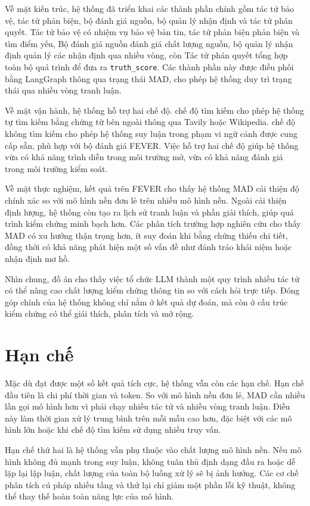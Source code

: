 ﻿\documentclass[oneside,a4paper,12pt]{extreport}
\begin{document}
Về mặt kiến trúc, hệ thống đã triển khai các thành phần chính gồm tác tử bảo vệ, tác tử phản biện, bộ đánh giá nguồn, bộ quản lý nhận định và tác tử phán quyết. Tác tử bảo vệ có nhiệm vụ bảo vệ bản tin, tác tử phản biện phản biện và tìm điểm yếu, Bộ đánh giá nguồn đánh giá chất lượng nguồn, bộ quản lý nhận định quản lý các nhận định qua nhiều vòng, còn Tác tử phán quyết tổng hợp toàn bộ quá trình để đưa ra \texttt{truth\_score}. Các thành phần này được điều phối bằng LangGraph thông qua trạng thái MAD, cho phép hệ thống duy trì trạng thái qua nhiều vòng tranh luận.

Về mặt vận hành, hệ thống hỗ trợ hai chế độ. chế độ tìm kiếm cho phép hệ thống tự tìm kiếm bằng chứng từ bên ngoài thông qua Tavily hoặc Wikipedia. chế độ không tìm kiếm cho phép hệ thống suy luận trong phạm vi ngữ cảnh được cung cấp sẵn, phù hợp với bộ đánh giá FEVER. Việc hỗ trợ hai chế độ giúp hệ thống vừa có khả năng trình diễn trong môi trường mở, vừa có khả năng đánh giá trong môi trường kiểm soát.

Về mặt thực nghiệm, kết quả trên FEVER cho thấy hệ thống MAD cải thiện độ chính xác so với mô hình nền đơn lẻ trên nhiều mô hình nền. Ngoài cải thiện định lượng, hệ thống còn tạo ra lịch sử tranh luận và phần giải thích, giúp quá trình kiểm chứng minh bạch hơn. Các phân tích trường hợp nghiên cứu cho thấy MAD có xu hướng thận trọng hơn, ít suy đoán khi bằng chứng thiếu chi tiết, đồng thời có khả năng phát hiện một số vấn đề như đánh tráo khái niệm hoặc nhận định mơ hồ.

Nhìn chung, đồ án cho thấy việc tổ chức LLM thành một quy trình nhiều tác tử có thể nâng cao chất lượng kiểm chứng thông tin so với cách hỏi trực tiếp. Đóng góp chính của hệ thống không chỉ nằm ở kết quả dự đoán, mà còn ở cấu trúc kiểm chứng có thể giải thích, phân tích và mở rộng.

\section{Hạn chế}

Mặc dù đạt được một số kết quả tích cực, hệ thống vẫn còn các hạn chế. Hạn chế đầu tiên là chi phí thời gian và token. So với mô hình nền đơn lẻ, MAD cần nhiều lần gọi mô hình hơn vì phải chạy nhiều tác tử và nhiều vòng tranh luận. Điều này làm thời gian xử lý trung bình trên mỗi mẫu cao hơn, đặc biệt với các mô hình lớn hoặc khi chế độ tìm kiếm sử dụng nhiều truy vấn.

Hạn chế thứ hai là hệ thống vẫn phụ thuộc vào chất lượng mô hình nền. Nếu mô hình không đủ mạnh trong suy luận, không tuân thủ định dạng đầu ra hoặc dễ lặp lại lập luận, chất lượng của toàn bộ luồng xử lý sẽ bị ảnh hưởng. Các cơ chế phân tích cú pháp nhiều tầng và thử lại chỉ giảm một phần lỗi kỹ thuật, không thể thay thế hoàn toàn năng lực của mô hình.
\end{document}
